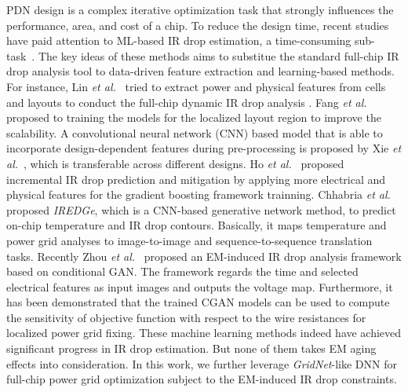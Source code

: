 \label{subsec:ml_em}
PDN design is a complex iterative optimization task that strongly influences the performance, area, and cost of a chip. To reduce the design time, recent studies have paid attention to ML-based IR drop estimation, a time-consuming sub-task~\cite{LinFang:2018vts,Fang:2018dynireco,HoKahng:ICCAD'19,Xie:2020powernet,Sachin:ASPDAC'21}. 
The key ideas of these methods aims to substitue the standard full-chip IR drop analysis tool to data-driven feature extraction and learning-based methods. For instance, Lin {\it et al.}~\cite{LinFang:2018vts} tried to extract power and physical features from cells and layouts to conduct the full-chip dynamic IR drop analysis . Fang {\it et al.}~\cite{Fang:2018dynireco} proposed to training the models for the localized layout region to improve the scalability.  A convolutional neural network (CNN) based model that is able to incorporate design-dependent features during pre-processing is proposed by Xie {\it et al.}~\cite{Xie:2020powernet}, which is transferable across different designs.
Ho {\it et al.}~\cite{HoKahng:ICCAD'19} proposed incremental IR drop prediction and mitigation by applying more electrical and physical features for the gradient boosting framework trainning. Chhabria {\it et al.}~\cite{Sachin:ASPDAC'21} proposed {\it IREDGe}, which is a CNN-based generative network method, to predict on-chip temperature and IR drop contours. Basically, it maps temperature and power grid analyses to image-to-image and sequence-to-sequence translation tasks.
Recently Zhou {\it et al.}~\cite{ZhouJin:ICCAD'20} proposed an EM-induced IR drop analysis framework based on conditional GAN. The framework regards the time and selected electrical features as input images and outputs the voltage map. Furthermore, it has been demonstrated that the trained CGAN models can be used to compute the sensitivity of objective function with respect to the wire resistances for localized power grid fixing.  These machine learning methods indeed have achieved significant progress in IR drop estimation. But none of them takes EM aging effects into consideration.
In this work, we further leverage {\it GridNet}-like DNN for full-chip power grid optimization subject to the EM-induced IR drop constraints.

